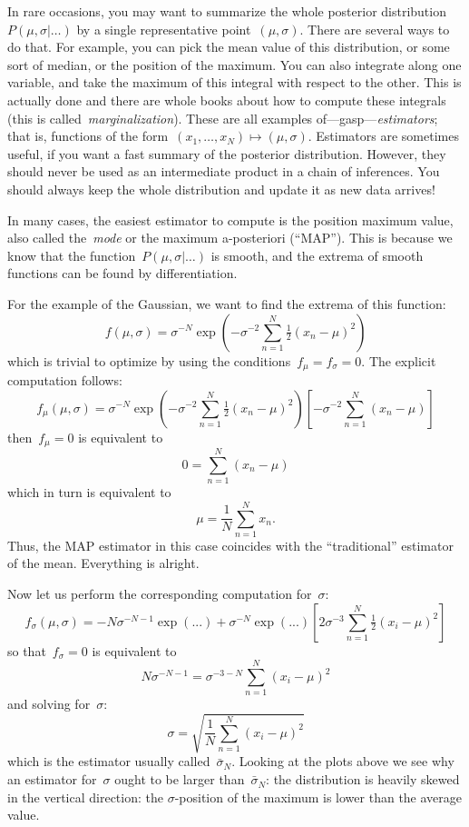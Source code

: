 In rare occasions, you may want to summarize the whole posterior
distribution~$P(\mu,\sigma|\ldots)$ by a single representative
point~$(\mu,\sigma)$.  There are several ways to do that.  For example, you
can pick the mean value of this distribution, or some sort of median, or the
position of the maximum.  You can also integrate along one variable, and take
the maximum of this integral with respect to the other.  This is actually
done and there are whole books about how to compute these integrals (this is
called~\emph{marginalization}).  These are all examples
of---gasp---\emph{estimators}; that is, functions of the
form~$(x_1,\ldots,x_N)\mapsto(\mu,\sigma)$.  Estimators are sometimes useful,
if you want a fast summary of the posterior distribution.  However, they
should never be used as an intermediate product in a chain of inferences.
You should always keep the whole distribution and update it as new data
arrives!

In many cases, the easiest estimator to compute is the position maximum
value, also called the~\emph{mode} or the maximum a-posteriori (``MAP'').
This is because we know that the function~$P(\mu,\sigma|\ldots)$ is smooth,
and the extrema of smooth functions can be found by differentiation.

For the example of the Gaussian, we want to find the extrema of this
function:
$$
f(\mu,\sigma)
=
\sigma^{-N}\exp\left(-\sigma^{-2}\sum_{n=1}^N\tfrac{1}{2}(x_n-\mu)^2\right)
$$
which is trivial to optimize by using the conditions~$f_\mu=f_\sigma=0$.
The explicit computation follows:
$$
f_\mu(\mu,\sigma)
=
\sigma^{-N}\exp\left(-\sigma^{-2}\sum_{n=1}^N\tfrac{1}{2}(x_n-\mu)^2\right)
\left[
	-\sigma^{-2}\sum_{n=1}^N(x_n-\mu)
\right]
$$
then~$f_\mu=0$ is equivalent to
$$
0 = \sum_{n=1}^N(x_n-\mu)
$$
which in turn is equivalent to
$$
\mu=\frac{1}{N}\sum_{n=1}^Nx_n.
$$
Thus, the MAP estimator in this case coincides with the ``traditional''
estimator of the mean.  Everything is alright.

Now let us perform the corresponding computation for~$\sigma$:
$$
f_\sigma(\mu,\sigma)
=
-N\sigma^{-N-1}\exp\left(...\right)
+\sigma^{-N}\exp\left(...\right)
\left[
	2\sigma^{-3}\sum_{n=1}^N\tfrac{1}{2}(x_i-\mu)^2
\right]
$$
so that~$f_\sigma=0$ is equivalent to
$$
N\sigma^{-N-1}
=
\sigma^{-3-N}\sum_{n=1}^N(x_i-\mu)^2
$$
and solving for~$\sigma$:
$$
\sigma=\sqrt{\frac{1}{N}\sum_{n=1}^N(x_i-\mu)^2}
$$
which is the estimator usually called~$\bar\sigma_{N}$.  Looking at the
plots above we see why an estimator for~$\sigma$ ought to be larger
than~$\bar\sigma_{N}$: the distribution is heavily skewed in the vertical
direction: the $\sigma$-position of the maximum is lower than the average
value.

